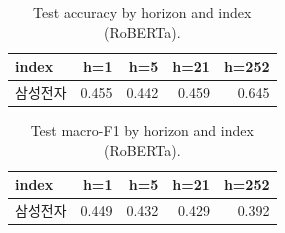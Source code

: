 \begin{table}[t]\centering
\caption{Test accuracy by horizon and index (RoBERTa).}
\begin{tabular}{lrrrr}
\toprule
index & h=1 & h=5 & h=21 & h=252 \\
\midrule
삼성전자 & 0.455 & 0.442 & 0.459 & 0.645 \\
\bottomrule
\end{tabular}
\end{table}

\begin{table}[t]\centering
\caption{Test macro-F1 by horizon and index (RoBERTa).}
\begin{tabular}{lrrrr}
\toprule
index & h=1 & h=5 & h=21 & h=252 \\
\midrule
삼성전자 & 0.449 & 0.432 & 0.429 & 0.392 \\
\bottomrule
\end{tabular}
\end{table}